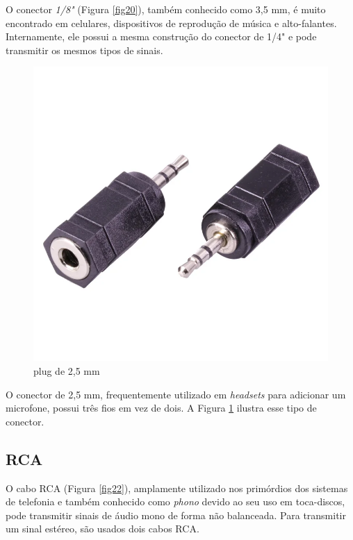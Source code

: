 O conector \textit{1/8"} (Figura \ref{fig20}), também conhecido como 3,5 mm, é muito encontrado em celulares, dispositivos de reprodução de música e alto-falantes. Internamente, ele possui a mesma construção do conector de 1/4" e pode transmitir os mesmos tipos de sinais.

\begin{figure}[h]
	\centering
    \includegraphics[scale=0.2]{figuras/fig21.png}
	\caption{plug de 2,5 mm \cite{mouser}}
	\label{fig21}
\end{figure}

O conector de 2,5 mm, frequentemente utilizado em \textit{headsets} para adicionar um microfone, possui três fios em vez de dois. A Figura \ref{fig21} ilustra esse tipo de conector.

\subsection{RCA}

O cabo RCA (Figura \ref{fig22}), amplamente utilizado nos primórdios dos sistemas de telefonia e também conhecido como \textit{phono} devido ao seu uso em toca-discos, pode transmitir sinais de áudio mono de forma não balanceada. Para transmitir um sinal estéreo, são usados dois cabos RCA.

